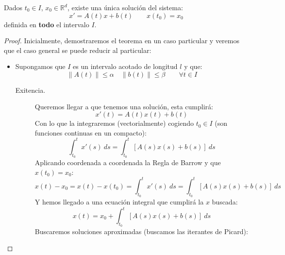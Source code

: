\begin{teo}\label{teo:existencia_unicidad_sistemas}
    Dados $t_0\in I$, $x_0\in \mathbb{R}^d$, existe una única solución del sistema:
    \begin{equation*}
        x' = A(t)x + b(t) \qquad x(t_0) = x_0
    \end{equation*}
    definida en \textbf{todo} el intervalo $I$.
    \begin{proof}
        Inicialmente, demostraremos el teorema en un caso particular y veremos que el caso general se puede reducir al particular:
        \begin{itemize}
            \item Supongamos que $I$ es un intervalo acotado de longitud $l$ y que:
                \begin{equation*}
                    \|A(t)\| \leq \alpha \quad \|b(t)\|\leq \beta \qquad \forall t\in I
                \end{equation*}
                \begin{description}
                    \item [Exitencia.] Queremos llegar a que tenemos una solución, esta cumplirá:
                        \begin{equation*}
                            x'(t) = A(t)x(t) + b(t)
                        \end{equation*}
                        Con lo que la integraremos (vectorialmente) cogiendo $t_0\in I$ (son funciones continuas en un compacto):
                        \begin{equation*}
                            \int_{t_0}^{t} x'(s)~ds  = \int_{t_0}^{t} [A(s)x(s) + b(s)]~ds 
                        \end{equation*}
                        Aplicando coordenada a coordenada la Regla de Barrow y que $x(t_0) = x_0$:
                        \begin{equation*}
                            x(t) - x_0 = x(t) - x(t_0) = \int_{t_0}^{t} x'(s)~ds  = \int_{t_0}^{t} [A(s)x(s) + b(s)]~ds 
                        \end{equation*}
                        Y hemos llegado a una ecuación integral que cumplirá la $x$ buscada:
                        \begin{equation*}
                            x(t) = x_0 + \int_{t_0}^{t} [A(s)x(s) + b(s)]~ds 
                        \end{equation*}
                        Buscaremos soluciones aproximadas (buscamos las iterantes de Picard):

\end{description}
\end{itemize}
\end{proof}
\end{teo}
